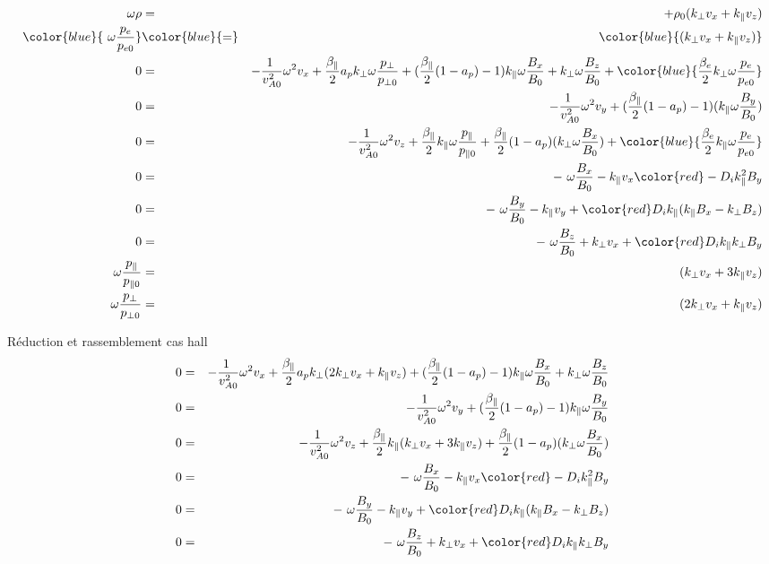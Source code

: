 \begin{eqnarray}
 \omega \rho&=&   + \rho_0 ( k_{\perp} v_x +  k_{\parallel} v_z) \nonumber \\
 \color{blue}{ \omega  \frac{p_{e}}{p_{e0}}} & \color{blue}{=}& \color{blue}{( k_{\perp} v_x +  k_{\parallel} v_z)}  \nonumber\\
 0 &=& - \frac{1 }{v^2_{A0}}\omega^2 v_x + \frac{\beta_{\parallel}}{2} a_p k_{\perp} \omega \frac{p_{\perp}}{p_{\perp 0}}  + (\frac{\beta_{\parallel}}{2}  (1 - a_p) -1) k_{\parallel} \omega \frac{B_x}{B_0} +k_{\perp} \omega \frac{B_z}{B_0}  + \color{blue}{\frac{\beta_{e}}{2} k_{\perp} \omega \frac{p_e}{p_{e0}} }\nonumber \\
 0 &=& - \frac{1 }{v^2_{A0}} \omega^2 v_y  + (\frac{\beta_{\parallel}}{2}  (1 - a_p) -1)(k_{\parallel}  \omega \frac{B_y}{B_0} ) \nonumber \\
 0 &=& - \frac{1 }{v^2_{A0}} \omega^2 v_z  +\frac{\beta_{\parallel}}{2} k_{\parallel} \omega \frac{p_{\parallel}}{p_{\parallel 0}} + \frac{\beta_{\parallel}}{2}  (1 - a_p) (k_{\perp} \omega \frac{B_x}{B_0} ) + \color{blue}{\frac{\beta_{e}}{2} k_{\parallel} \omega \frac{p_e}{p_{e0}} } \nonumber\\ 
0 &=&  - \omega   \frac{B_x}{B_0} -  k_{\parallel} v_x  {\color{red} - D_i k^2_{\parallel} B_y } \nonumber \\ 
 0 &=& - \omega  \frac{B_y}{B_0} -  k_{\parallel} v_y  + {\color{red}D_i k_{\parallel} (k_{\parallel} B_x - k_{\perp} B_z) } \nonumber\\
 0 &=& - \omega \frac{B_z}{B_0} +  k_{\perp} v_x   + {\color{red}D_ik_{\parallel}  k_{\perp} B_y  }\nonumber  \\
 \omega \frac{p_{\parallel}}{p_{\parallel 0}} &=&    (k_{\perp} v_x + 3 k_{\parallel} v_z) \nonumber\\
 \omega \frac{p_{\perp}}{p_{\perp 0}} &=&   (2k_{\perp} v_x +k_{\parallel} v_z) \nonumber
\end{eqnarray}

Réduction et rassemblement cas hall
\begin{eqnarray}
 0 &=&  - \frac{1 }{v^2_{A0}}\omega^2 v_x + \frac{\beta_{\parallel}}{2} a_p k_{\perp}(2k_{\perp} v_x +k_{\parallel} v_z)  + (\frac{\beta_{\parallel}}{2}  (1 - a_p) -1) k_{\parallel} \omega \frac{B_x}{B_0} +k_{\perp} \omega \frac{B_z}{B_0}   \nonumber\\
  0 &=& - \frac{1 }{v^2_{A0}} \omega^2 v_y  + (\frac{\beta_{\parallel}}{2}  (1 - a_p) -1)k_{\parallel}  \omega \frac{B_y}{B_0} \nonumber  \\
 0 &=&  - \frac{1 }{v^2_{A0}} \omega^2 v_z  +\frac{\beta_{\parallel}}{2} k_{\parallel} (k_{\perp} v_x + 3 k_{\parallel} v_z) + \frac{\beta_{\parallel}}{2}  (1 - a_p) (k_{\perp} \omega \frac{B_x}{B_0} )\nonumber \\ 
0 &=&  - \omega   \frac{B_x}{B_0} -  k_{\parallel} v_x  {\color{red} - D_i k^2_{\parallel} B_y }  \nonumber\\ 
 0 &=& - \omega  \frac{B_y}{B_0} -  k_{\parallel} v_y  + {\color{red}D_i k_{\parallel} (k_{\parallel} B_x - k_{\perp} B_z) } \nonumber\\
 0 &=& - \omega \frac{B_z}{B_0} +  k_{\perp} v_x   + {\color{red}D_ik_{\parallel}  k_{\perp} B_y  }  \nonumber
\end{eqnarray}

